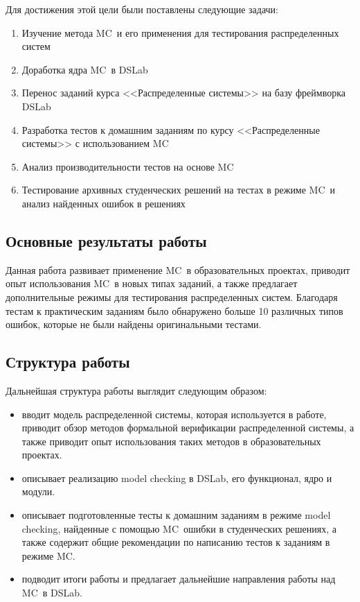\documentclass[a4paper,12pt]{extarticle}
\newcommand{\mc}[0]{MC}
\begin{document}
Для достижения этой цели были поставлены следующие задачи:

\begin{enumerate}
    \item Изучение метода \mc\ и его применения для тестирования распределенных систем
    \item Доработка ядра \mc\ в DSLab
    \item Перенос заданий курса <<Распределенные системы>> на базу фреймворка DSLab
	\item Разработка тестов к домашним заданиям по курсу <<Распределенные системы>> с использованием \mc
	\item Анализ производительности тестов на основе \mc
    \item Тестирование архивных студенческих решений на тестах в режиме \mc\ и анализ найденных ошибок в решениях
\end{enumerate}


\subsection{Основные результаты работы}

Данная работа развивает применение \mc\ в образовательных проектах, приводит опыт использования \mc\ в новых типах заданий, а также предлагает дополнительные режимы для тестирования распределенных систем.
Благодаря тестам к практическим заданиям было обнаружено больше 10 различных типов ошибок, которые не были найдены оригинальными тестами.

\subsection{Структура работы}

Дальнейшая структура работы выглядит следующим образом:

\begin{itemize}
\item {} вводит модель распределенной системы, которая используется в работе, приводит обзор методов формальной верификации распределенной системы, а также приводит опыт использования таких методов в образовательных проектах.
\item {} описывает реализацию model checking в DSLab, его функционал, ядро и модули.
\item {} описывает подготовленные тесты к домашним заданиям в режиме model checking, найденные с помощью \mc\ ошибки в студенческих решениях, а также содержит общие рекомендации по написанию тестов к заданиям в режиме \mc.
\item {} подводит итоги работы и предлагает дальнейшие направления работы над \mc\ в DSLab. 
\end{itemize}
\end{document}
